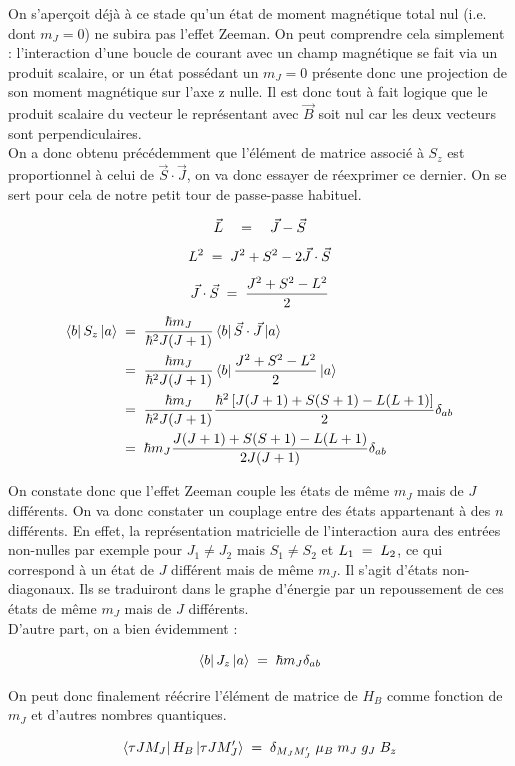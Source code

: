 On s'aperçoit déjà à ce stade qu'un état de moment magnétique total nul (i.e. dont $m_J = 0$) ne subira pas l'effet Zeeman. On peut comprendre cela simplement : l'interaction d'une boucle de courant avec un champ magnétique se fait via un produit scalaire, or un état possédant un  $m_J = 0$ présente donc une projection de son moment magnétique sur l'axe z nulle. Il est donc tout à fait logique que le produit scalaire du vecteur le représentant avec $\vec{B}$ soit nul car les deux vecteurs sont perpendiculaires.\\
On a donc obtenu précédemment que l'élément de matrice associé à $S_z$ est proportionnel à celui de $\vec{S}\cdot\vec{J}$, on va donc essayer de réexprimer ce dernier. On se sert pour cela de notre petit tour de passe-passe habituel.

\[
    \vec{L} \quad = \quad \vec{J} - \vec{S}
\]
\[
    L^2 \; = \; J^2 + S^2 - 2\vec{J}\cdot \vec{S}
\]
\[
    \vec{J}\cdot \vec{S} \; = \; \dfrac{J^2 + S^2 - L^2}{2}
\]
\begin{align*}
    \bra{b}S_z\ket{a} 
    &\; = \; 
    \dfrac{\hbar m_J}{\hbar^2 J(J+1)} \bra{b}\vec{S}\cdot\vec{J}\ket{a}\\
    &\; = \;
    \dfrac{\hbar m_J}{\hbar^2 J(J+1)} \bra{b}  \dfrac{J^2 + S^2 - L^2}{2}  \ket{a}\\
    &\; = \;
    \dfrac{\hbar m_J}{\hbar^2 J(J+1)} \dfrac{\hbar^2 \left[J(J+1) + S(S+1) - L(L+1) \right]}{2}\delta_{ab}\\
    &\; = \;
    \hbar m_J \dfrac{J(J+1) + S(S+1) - L(L+1) }{2J(J+1)} \delta_{ab}
\end{align*}

On constate donc que l'effet Zeeman couple les états de même $m_J$ mais de $J$ différents. On va donc constater un couplage entre des états appartenant à des $n$ différents. En effet, la représentation matricielle de l'interaction aura des entrées non-nulles par exemple pour $J_1\neq J_2$ mais $S_1\neq S_2$ et $L_1 \; = \; L_2$, ce qui correspond à un état de $J$ différent mais de même $m_J$. Il s'agit d'états non-diagonaux. Ils se traduiront dans le graphe d'énergie par un repoussement de ces états de même $m_J$ mais de $J$ différents.\\
D'autre part, on a bien évidemment :

\[
    \bra{b}J_z\ket{a} \; = \; \hbar m_J \delta_{ab}
\]

On peut donc finalement réécrire l'élément de matrice de $H_B$ comme fonction de $m_J$ et d'autres nombres quantiques.

\[
    \bra{\tau J M_J}H_B\ket{\tau J M'_J} \; = \; \delta_{M_J M'_J} \;\mu_B \; m_J \; g_J \; B_z
\]

